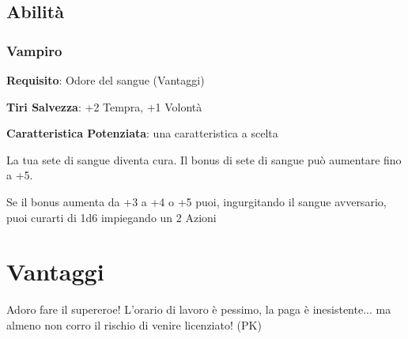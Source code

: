 \documentclass[a4paper,twoside,openany]{book}
\begin{document}
\pagebreak

\subsection{Abilità}

\subsubsection*{Vampiro}\label{abilitavampiro}

\textbf{Requisito}: Odore del sangue (Vantaggi)

\textbf{Tiri Salvezza}: +2 Tempra, +1 Volontà

\textbf{Caratteristica Potenziata}: una caratteristica a scelta

La tua sete di sangue diventa cura. Il bonus di sete di sangue può aumentare fino a +5.

Se il bonus aumenta da +3 a +4 o +5 puoi, ingurgitando il sangue avversario, puoi curarti di 1d6 impiegando un 2 Azioni

\pagebreak


\section{Vantaggi}\hypertarget{vantaggi}{}\label{vantaggiinizio}

\begin{changemargin}{0.3cm}{0.3cm}\begin{enfasi}{Adoro fare il supereroe! L'orario di lavoro è pessimo, la paga è inesistente... ma almeno non corro il rischio di venire licenziato! (PK)
}\end{enfasi}\end{changemargin}\medskip
\end{document}
